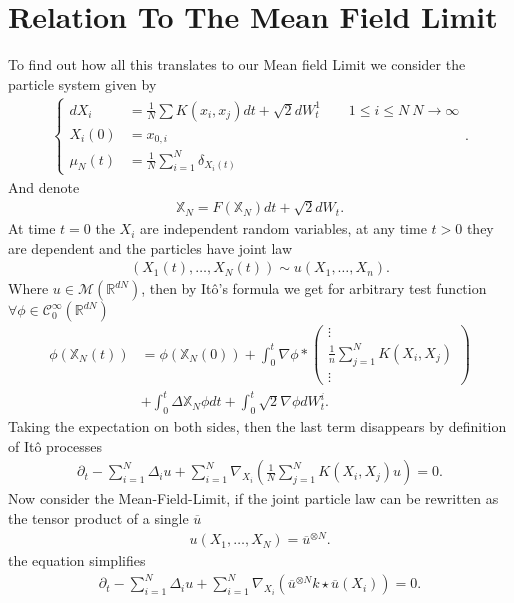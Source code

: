 \section{Relation To The Mean Field Limit}
To find out how all this translates to our Mean field Limit we consider the particle system given by 
\begin{align*}
  \begin{cases}  
  d X_i &=  \frac{1}{N} \sum K(x_i,x_j) dt + \sqrt{2} dW_t^1  \qquad 1\le i\le N \ N\to \infty\\
  X_i(0)    &= x_{0,i} \\
  \mu_N(t) &= \frac{1}{N} \sum_{i=1}^{N} \delta_{X_i(t)} 
  \end{cases}
.\end{align*}
And denote 
\begin{align*}
  \mathbb{X}_N = F(\mathbb{X}_N) dt + \sqrt{2}dW_{t} 
.\end{align*}
At time $t = 0$ the $X_i$ are independent random variables, at any time $t>0$ they are dependent and the particles have joint law 
\begin{align*}
  (X_{1}(t),\ldots ,X_N(t)) \sim  u(X_{1},\ldots ,X_n)
.\end{align*}
Where $u \in  \mathcal{M}(\mathbb{R}^{dN})$, then by It\^o's formula we get for arbitrary test function $\forall  \phi  \in  \mathcal{C}_0^{\infty}(\mathbb{R}^{dN} ) $ 
\begin{align*}
  \phi(\mathbb{X}_N(t)) &=  \phi(\mathbb{X}_N(0)) + \int_0^{t} \nabla\phi  *\begin{pmatrix} \vdots \\ \frac{1}{n} \sum_{j=1}^{N} K(X_i,X_j) \\ \vdots  \end{pmatrix} \\
                        &+ \int_0^{t}  \Delta{\mathbb{X}_N} \phi  dt + \int_0^{t} \sqrt{2} \nabla \phi  dW_t^{i} 
.\end{align*}
Taking the expectation on both sides, then the last term disappears by definition of It\^o processes 
\begin{align*}
  \partial_t - \sum_{i=1}^{N} \Delta_i u  + \sum_{i=1}^{N} \nabla_{X_i} \left( \frac{1}{N} \sum_{j=1}^{N} K(X_i,X_j) u \right)  = 0
.\end{align*}
Now consider the Mean-Field-Limit, if the joint particle law can be rewritten as the tensor product of a single $\overline{u}$ 
\begin{align*}
 u(X_{1},\ldots ,X_N)  = \overline{u}^{\otimes N}  
.\end{align*}
the equation simplifies
\begin{align*}
  \partial_t - \sum_{i=1}^{N} \Delta_i u  + \sum_{i=1}^{N} \nabla_{X_i} \left( \overline{u}^{\otimes N}k \star \overline{u}(X_i)   \right)  = 0
.\end{align*}
\newpage
